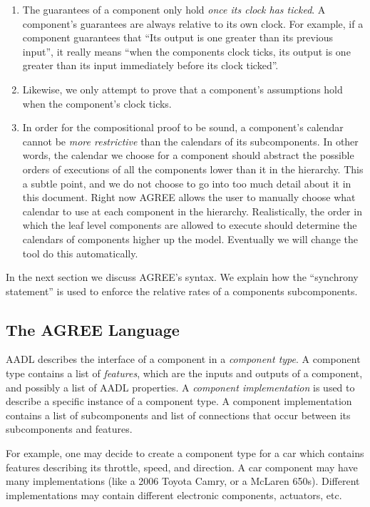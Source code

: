 \documentclass{llncs}
\begin{document}
\begin{enumerate}
\item The guarantees of a component only hold \textit{once its clock has ticked}.  A component's guarantees are always relative to its own clock. For example, if a component guarantees that ``Its output is one greater than its previous input'', it really means ``when the components clock ticks, its output is one greater than its input immediately before its clock ticked''.

\item Likewise, we only attempt to prove that a component's assumptions hold when the component's clock ticks.

\item In order for the compositional proof to be sound, a component's calendar cannot be \textit{more restrictive} than the calendars of its subcomponents.  In other words, the calendar we choose for a component should abstract the possible orders of executions of all the components lower than it in the hierarchy. This a subtle point, and we do not choose to go into too much detail about it in this document.  Right now AGREE allows the user to manually choose what calendar to use at each component in the hierarchy.  Realistically, the order in which the leaf level components are allowed to execute should determine the calendars of components higher up the model.  Eventually we will change the tool do this automatically.
\end{enumerate}

In the next section we discuss AGREE's syntax.  We explain how the ``synchrony statement'' is used to enforce the relative rates of a components subcomponents.

\subsection{The AGREE Language}

AADL describes the interface of a component in a \textit{component type}. A component type contains a list of \textit{features}, which are the inputs and outputs of a component, and possibly a list of AADL properties.  A \textit{component implementation} is used to describe a specific instance of a component type.  A component implementation contains a list of subcomponents and list of connections that occur between its subcomponents and features.  

For example, one may decide to create a component type for a car which contains features describing its throttle, speed, and direction.  A car component may have many implementations (like a 2006 Toyota Camry, or a McLaren 650s). Different implementations may contain different electronic components, actuators, etc.
\end{document}
